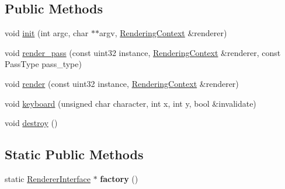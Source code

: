 \subsection*{Public Methods}
\begin{DoxyCompactItemize}
\item 
void \hyperlink{struct_p_s_f_p_t_ad44f7f2769bcae6881eebf04a99f57ef}{init} (int argc, char $\ast$$\ast$argv, \hyperlink{struct_rendering_context}{Rendering\+Context} \&renderer)
\item 
void \hyperlink{struct_p_s_f_p_t_a1abf10b172530da4aab53a4d70b745d8}{render\+\_\+pass} (const uint32 instance, \hyperlink{struct_rendering_context}{Rendering\+Context} \&renderer, const Pass\+Type pass\+\_\+type)
\item 
void \hyperlink{struct_p_s_f_p_t_aac923cb36f8f1d8ad27f01becef44fd9}{render} (const uint32 instance, \hyperlink{struct_rendering_context}{Rendering\+Context} \&renderer)
\item 
void \hyperlink{struct_p_s_f_p_t_a361baa29c599173c9517464bc534c886}{keyboard} (unsigned char character, int x, int y, bool \&invalidate)
\item 
void \hyperlink{struct_p_s_f_p_t_ad22588eeea40701d2af23513262a08bd}{destroy} ()
\end{DoxyCompactItemize}
\subsection*{Static Public Methods}
\begin{DoxyCompactItemize}
\item 
\mbox{\label{struct_p_s_f_p_t_a15fe9708102a975257cc24450dee7306}} 
static \hyperlink{struct_renderer_interface}{Renderer\+Interface} $\ast$ {\bfseries factory} ()
\end{DoxyCompactItemize}
